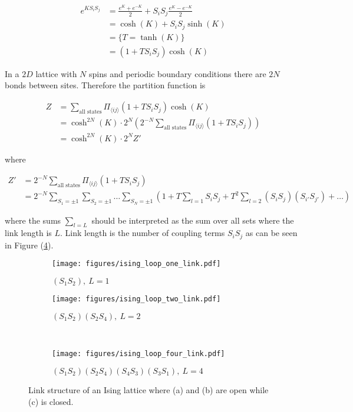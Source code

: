 \begin{align*}
    e^{KS_i S_j} &= \frac{e^K + e^{-K}}{2} + S_i S_j \frac{e^K - e^{-K}}{2} \\
    &= \cosh (K) + S_i S_j \sinh(K) \\
    &= \{ T = \tanh(K) \} \\
    &= (1 + T S_i S_j) \cosh(K)
\end{align*}

In a $2D$ lattice with $N$ spins and periodic boundary conditions there are $2N$ bonds between sites. Therefore the partition function is

\begin{align*}
    Z &= \sum_{\text{all states}} \Pi_{\langle ij \rangle} (1 + T S_i S_j) \cosh(K) \\
    &= \cosh^{2N} (K) \cdot 2^N \left ( 2^{-N} \sum_{\text{all states}} \Pi_{\langle ij \rangle} (1 + T S_i S_j) \right ) \\
    &= \cosh^{2N} (K) \cdot 2^N Z'
\end{align*}

where

\begin{align*}
    Z' &= 2^{-N} \sum_{\text{all states}} \Pi_{\langle ij \rangle} (1 + T S_i S_j) \\
    &= 2^{-N} \sum_{S_1 = \pm 1} \sum_{S_2 = \pm 1} \ldots \sum_{S_N = \pm 1} \left ( 1 + T \sum_{l = 1} S_i S_j + T^2 \sum_{l = 2} (S_i S_j)(S_{i'} S_{j'}) + \ldots \right ) 
\end{align*}

where the sums $\sum_{l=L}$ should be interpreted as the sum over all sets where the link length is $L$. Link length is the number of coupling terms $S_i S_j$ as can be seen in Figure (\ref{fig:LinkIsing}).

\begin{figure}[h!]
    \begin{subfigure}{.5\linewidth}
        \centering
        \texttt{[image: figures/ising\_loop\_one\_link.pdf]}
        \caption{$(S_1 S_2), \ L = 1$}
        \label{fig:oneLinkIsing}
    \end{subfigure}%
    \begin{subfigure}{.5\linewidth}
        \centering
        \texttt{[image: figures/ising\_loop\_two\_link.pdf]}
        \caption{$(S_1 S_2)(S_2 S_4), \ L = 2$}
        \label{fig:twoLinkIsing}
    \end{subfigure}\\[1ex]
    \begin{subfigure}{\linewidth}
        \centering
        \texttt{[image: figures/ising\_loop\_four\_link.pdf]}
        \caption{$(S_1 S_2)(S_2 S_4)(S_4 S_3)(S_3 S_1), \ L = 4$}
    \label{fig:fourLinkIsing}
    \end{subfigure}
    \caption{Link structure of an Ising lattice where (a) and (b) are open while (c) is closed.}
    \label{fig:LinkIsing}
\end{figure}

